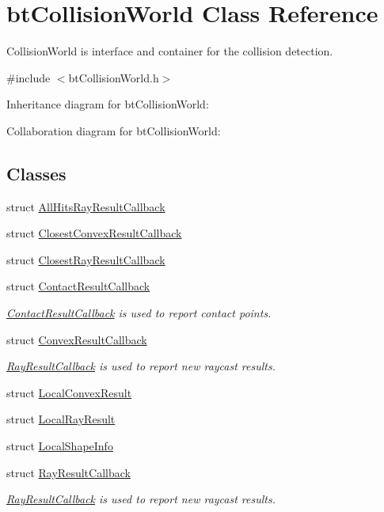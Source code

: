 \hypertarget{classbt_collision_world}{\section{bt\+Collision\+World Class Reference}
\label{classbt_collision_world}
}


Collision\+World is interface and container for the collision detection.  




{\ttfamily \#include $<$bt\+Collision\+World.\+h$>$}



Inheritance diagram for bt\+Collision\+World\+:


Collaboration diagram for bt\+Collision\+World\+:
\subsection*{Classes}
\begin{DoxyCompactItemize}
\item 
struct \hyperlink{structbt_collision_world_1_1_all_hits_ray_result_callback}{All\+Hits\+Ray\+Result\+Callback}
\item 
struct \hyperlink{structbt_collision_world_1_1_closest_convex_result_callback}{Closest\+Convex\+Result\+Callback}
\item 
struct \hyperlink{structbt_collision_world_1_1_closest_ray_result_callback}{Closest\+Ray\+Result\+Callback}
\item 
struct \hyperlink{structbt_collision_world_1_1_contact_result_callback}{Contact\+Result\+Callback}
\begin{DoxyCompactList}\small\item\em \hyperlink{structbt_collision_world_1_1_contact_result_callback}{Contact\+Result\+Callback} is used to report contact points. \end{DoxyCompactList}\item 
struct \hyperlink{structbt_collision_world_1_1_convex_result_callback}{Convex\+Result\+Callback}
\begin{DoxyCompactList}\small\item\em \hyperlink{structbt_collision_world_1_1_ray_result_callback}{Ray\+Result\+Callback} is used to report new raycast results. \end{DoxyCompactList}\item 
struct \hyperlink{structbt_collision_world_1_1_local_convex_result}{Local\+Convex\+Result}
\item 
struct \hyperlink{structbt_collision_world_1_1_local_ray_result}{Local\+Ray\+Result}
\item 
struct \hyperlink{structbt_collision_world_1_1_local_shape_info}{Local\+Shape\+Info}
\item 
struct \hyperlink{structbt_collision_world_1_1_ray_result_callback}{Ray\+Result\+Callback}
\begin{DoxyCompactList}\small\item\em \hyperlink{structbt_collision_world_1_1_ray_result_callback}{Ray\+Result\+Callback} is used to report new raycast results. \end{DoxyCompactList}\end{DoxyCompactItemize}
